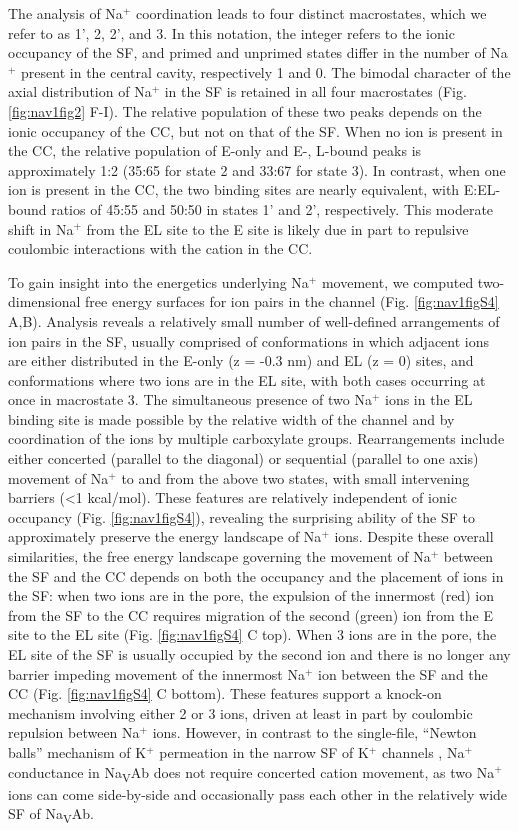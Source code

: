 \begin{refsection}
The analysis of Na$^+$ coordination leads to four distinct macrostates, which we refer to as 1', 2, 2', and 3.  In this notation, the integer refers to the ionic occupancy of the SF, and primed and unprimed states differ in the number of Na$^+$ present in the central cavity, respectively 1 and 0.  The bimodal character of the axial distribution of Na$^+$ in the SF is retained in all four macrostates (Fig. \ref{fig:nav1fig2} F-I).  The relative population of these two peaks depends on the ionic occupancy of the CC, but not on that of the SF.  When no ion is present in the CC, the relative population of E-only and E-, L-bound peaks is approximately 1:2 (35:65 for state 2 and 33:67 for state 3).  In contrast, when one ion is present in the CC, the two binding sites are nearly equivalent, with E:EL-bound ratios of 45:55 and 50:50 in states 1' and 2', respectively.  This moderate shift in Na$^+$ from the EL site to the E site is likely due in part to repulsive coulombic interactions with the cation in the CC.  

To gain insight into the energetics underlying Na$^+$ movement, we computed two-dimensional free energy surfaces for ion pairs in the channel (Fig. \ref{fig:nav1figS4} A,B).  Analysis reveals a relatively small number of well-defined arrangements of ion pairs in the SF, usually comprised of conformations in which adjacent ions are either distributed in the E-only (z = -0.3 nm) and EL (z = 0) sites, and conformations where two ions are in the EL site, with both cases occurring at once in macrostate 3.  The simultaneous presence of two Na$^+$ ions in the EL binding site is made possible by the relative width of the channel and by coordination of the ions by multiple carboxylate groups.  Rearrangements include either concerted (parallel to the diagonal) or sequential (parallel to one axis) movement of Na$^+$ to and from the above two states, with small intervening barriers (<1 kcal/mol).  These features are relatively independent of ionic occupancy (Fig. \ref{fig:nav1figS4}), revealing the surprising ability of the SF to approximately preserve the energy landscape of Na$^+$ ions. Despite these overall similarities, the free energy landscape governing the movement of Na$^+$ between the SF and the CC depends on both the occupancy and the placement of ions in the SF: when two ions are in the pore, the expulsion of the innermost (red) ion from the SF to the CC requires migration of the second (green) ion from the E site to the EL site (Fig. \ref{fig:nav1figS4} C top). When 3 ions are in the pore, the EL site of the SF is usually occupied by the second ion and there is no longer any barrier impeding movement of the innermost Na$^+$ ion between the SF and the CC (Fig. \ref{fig:nav1figS4} C bottom).  These features support a knock-on mechanism involving either 2 or 3 ions, driven at least in part by coulombic repulsion between Na$^+$ ions.  However, in contrast to the single-file, ``Newton balls'' mechanism of K$^+$ permeation in the narrow SF of K$^+$ channels \cite{MoraisCabral:2001bp}, Na$^+$ conductance in Na\textsubscript{V}Ab does not require concerted cation movement, as two Na$^+$ ions can come side-by-side and occasionally pass each other in the relatively wide SF of Na\textsubscript{V}Ab.


\end{refsection}
